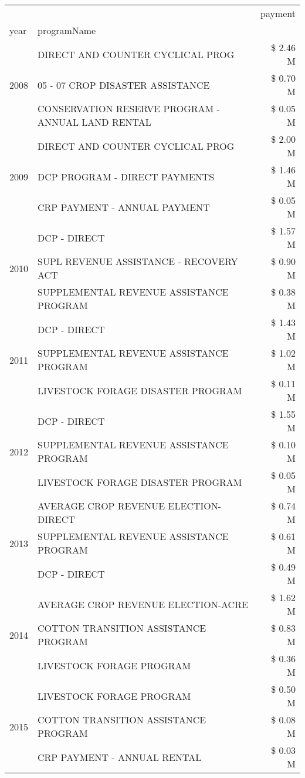 \begin{tabular}{llr}
\toprule
 &  & payment \\
year & programName &  \\
\midrule
\multirow[t]{3}{*}{2008} & DIRECT AND COUNTER CYCLICAL PROG & \$ 2.46 M \\
 & 05 - 07 CROP DISASTER ASSISTANCE & \$ 0.70 M \\
 & CONSERVATION RESERVE PROGRAM - ANNUAL LAND RENTAL & \$ 0.05 M \\
\cline{1-3}
\multirow[t]{3}{*}{2009} & DIRECT AND COUNTER CYCLICAL PROG & \$ 2.00 M \\
 & DCP PROGRAM - DIRECT PAYMENTS & \$ 1.46 M \\
 & CRP PAYMENT - ANNUAL PAYMENT & \$ 0.05 M \\
\cline{1-3}
\multirow[t]{3}{*}{2010} & DCP - DIRECT & \$ 1.57 M \\
 & SUPL REVENUE ASSISTANCE - RECOVERY ACT & \$ 0.90 M \\
 & SUPPLEMENTAL REVENUE ASSISTANCE PROGRAM & \$ 0.38 M \\
\cline{1-3}
\multirow[t]{3}{*}{2011} & DCP - DIRECT & \$ 1.43 M \\
 & SUPPLEMENTAL REVENUE ASSISTANCE PROGRAM & \$ 1.02 M \\
 & LIVESTOCK FORAGE DISASTER PROGRAM & \$ 0.11 M \\
\cline{1-3}
\multirow[t]{3}{*}{2012} & DCP - DIRECT & \$ 1.55 M \\
 & SUPPLEMENTAL REVENUE ASSISTANCE PROGRAM & \$ 0.10 M \\
 & LIVESTOCK FORAGE DISASTER PROGRAM & \$ 0.05 M \\
\cline{1-3}
\multirow[t]{3}{*}{2013} & AVERAGE CROP REVENUE ELECTION-DIRECT & \$ 0.74 M \\
 & SUPPLEMENTAL REVENUE ASSISTANCE PROGRAM & \$ 0.61 M \\
 & DCP - DIRECT & \$ 0.49 M \\
\cline{1-3}
\multirow[t]{3}{*}{2014} & AVERAGE CROP REVENUE ELECTION-ACRE & \$ 1.62 M \\
 & COTTON TRANSITION ASSISTANCE PROGRAM & \$ 0.83 M \\
 & LIVESTOCK FORAGE PROGRAM & \$ 0.36 M \\
\cline{1-3}
\multirow[t]{3}{*}{2015} & LIVESTOCK FORAGE PROGRAM & \$ 0.50 M \\
 & COTTON TRANSITION ASSISTANCE PROGRAM & \$ 0.08 M \\
 & CRP PAYMENT - ANNUAL RENTAL & \$ 0.03 M \\

\end{tabular}
